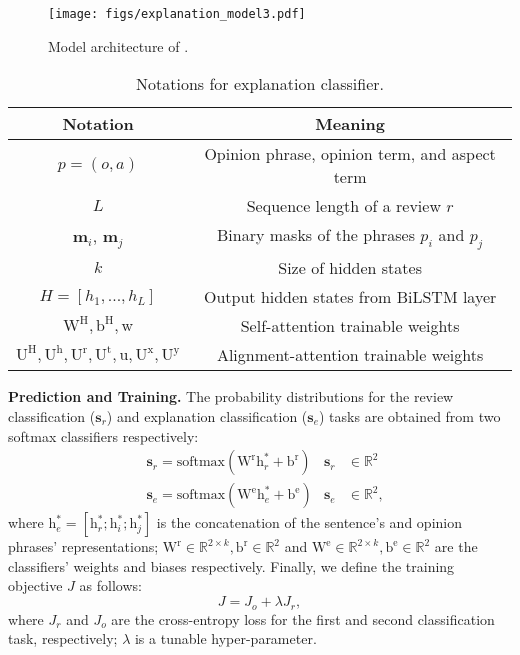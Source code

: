 \begin{figure}[!t]
    \centering
    \texttt{[image: figs/explanation\_model3.pdf]}
    \caption{Model architecture of \expcls.}
    \label{fig:expmodel}
\vspace{-3mm}
\end{figure}


\setlength{\tabcolsep}{2pt}
\begin{table}[!t]
    \small
    \centering
    \begin{tabular}{cc}
    \toprule
        \textbf{Notation} & \textbf{Meaning} \\ \midrule
        $p = (o, a)$ & Opinion phrase, opinion term, and aspect term \\
        $L$ & Sequence length of a review $r$ \\
        $\mathbf{m}_i$, $\mathbf{m}_j$ & Binary masks of the phrases $p_i$ and $p_j$ \\ 
        $k$ & Size of hidden states \\
        $H=[h_1, ..., h_L]$ & Output hidden states from BiLSTM layer \\
        $\mathrm{W}^\mathrm{H}, \mathrm{b}^\mathrm{H}, \mathrm{w}$ & Self-attention trainable weights \\
        $\mathrm{U}^\mathrm{H}, \mathrm{U}^\mathrm{h}, \mathrm{U}^\mathrm{r}, \mathrm{U}^\mathrm{t}, \mathrm{u}, \mathrm{U}^{\mathrm{x}}, \mathrm{U}^{\mathrm{y}}$ & Alignment-attention trainable weights \\
        \bottomrule
    \end{tabular}
    \caption{Notations for explanation classifier.}
    \label{tab:symbol1}
    \vspace{-3mm}
\end{table}

\smallskip
\noindent \textbf{Prediction and Training.} 
The probability distributions for the review classification ($\mathbf{s}_r$) and explanation classification 
($\mathbf{s}_e$) tasks are obtained from two softmax classifiers respectively:
\begin{align}
    &\mathbf{s}_r = \text{softmax}(\mathrm{W}^{\mathrm{r}} \mathrm{h}_r^* + \mathrm{b}^{\mathrm{r}}) & \mathbf{s}_r& \in \mathbb{R}^{2}\\
    &\mathbf{s}_e = \text{softmax}(\mathrm{W}^{\mathrm{e}} \mathrm{h}_e^* + \mathrm{b}^{\mathrm{e}}) & \mathbf{s}_e& \in \mathbb{R}^{2}, \label{eq:e}
\end{align}
where $\mathrm{h}_e^*= [\mathrm{h}_r^* ; \mathrm{h}_i^* ; \mathrm{h}_j^* ]$ is the concatenation of the sentence's and opinion phrases' representations;
$\mathrm{W}^{\mathrm{r}} \in \mathbb{R}^{2\times k}, \mathrm{b}^{\mathrm{r}} \in \mathbb{R}^2$ and 
$\mathrm{W}^{\mathrm{e}} \in \mathbb{R}^{2\times k}, \mathrm{b}^{\mathrm{e}} \in \mathbb{R}^2$ are the classifiers' weights and biases respectively.
Finally, we define the training objective $J$ as follows:
\vspace{-1mm}
\begin{equation}
J = J_o + \lambda J_r,
\end{equation}
%
where $J_r$ and $J_o$ are the cross-entropy loss for the first and second classification task, respectively;
$\lambda$ is a tunable hyper-parameter.